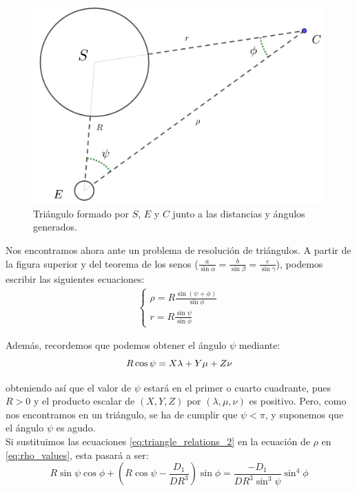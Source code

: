 \documentclass[11pt]{book}
\newcommand\ddfrac[2]{\frac{\displaystyle #1}{\displaystyle #2}}
\begin{document}
\begin{figure}[H]
\centering
\includegraphics[scale=0.15]{images/notation_angles.png}
\caption{Triángulo formado por $S$, $E$ y $C$ junto a las distancias y ángulos generados.}
\label{fig:notation_angles}
\end{figure}

Nos encontramos ahora ante un problema de resolución de triángulos. A partir de la figura superior y del teorema de los senos ($\ddfrac{a}{\sin{\alpha}}=\ddfrac{b}{\sin{\beta}}=\ddfrac{c}{\sin{\gamma}}$), podemos escribir las siguientes ecuaciones:
\begin{align}
\left\{
\begin{array}{l}
	\rho=R\ddfrac{\sin{(\psi+\phi)}}{\sin{\phi}}\\
	r=R\ddfrac{\sin{\psi}}{\sin{\phi}}
\end{array}
\right.
\label{eq:triangle_relations_2}
\end{align}

Además, recordemos que podemos obtener el ángulo $\psi$ mediante:
\[
R\cos{\psi}=X\lambda+Y\mu+Z\nu\\
\]

\noindent obteniendo así que el valor de $\psi$ estará en el primer o cuarto cuadrante, pues $R>0$ y el producto escalar de $(X,Y,Z)$ por $(\lambda,\mu,\nu)$ es positivo. Pero, como nos encontramos en un triángulo, se ha de cumplir que $\psi<\pi$, y suponemos que el ángulo $\psi$ es agudo.\\

Si sustituimos las ecuaciones  \eqref{eq:triangle_relations_2} en la ecuación de $\rho$ en \eqref{eq:rho_values}, esta pasará a ser:
\[
R\sin{\psi}\cos{\phi}+\left(R\cos{\psi}-\ddfrac{D_1}{DR^3}\right)\sin{\phi}=\ddfrac{-D_1}{DR^3\sin^3{\psi}}\sin^4{\phi}
\]
\end{document}
